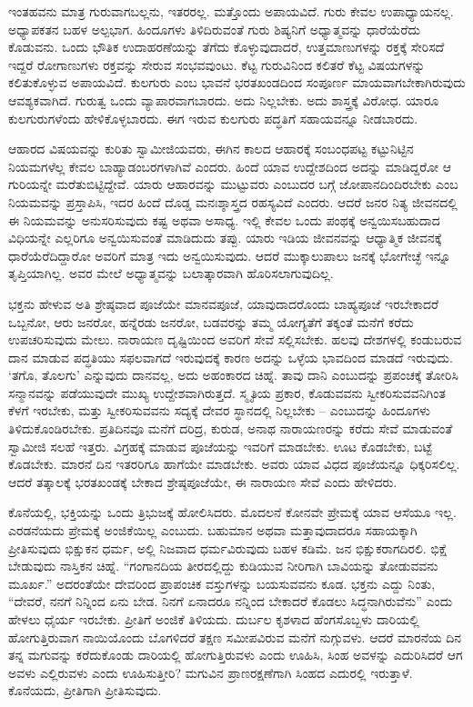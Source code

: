 ಇಂತಹವನು ಮಾತ್ರ ಗುರುವಾಗಬಲ್ಲನು, ಇತರರಲ್ಲ. ಮತ್ತೊಂದು ಅಪಾಯವಿದೆ. ಗುರು ಕೇವಲ ಉಪಾಧ್ಯಾಯನಲ್ಲ. ಅಧ್ಯಾಪಕತನ ಬಹಳ ಅಲ್ಪಭಾಗ. ಹಿಂದೂಗಳು ತಿಳಿದಿರುವಂತೆ ಗುರು ಶಿಷ್ಯನಿಗೆ ಅಧ್ಯಾತ್ಮವನ್ನು ಧಾರೆಯೆರೆದು ಕೊಡುವನು. ಒಂದು ಭೌತಿಕ ಉದಾಹರಣೆಯನ್ನು ತೆಗೆದು ಕೊಳ್ಳುವುದಾದರೆ, ಉತ್ತಮಾಣುಗಳನ್ನು ರಕ್ತಕ್ಕೆ ಸೇರಿಸದೆ ಇದ್ದರೆ ರೋಗಾಣುಗಳು ರಕ್ತವನ್ನು ಸೇರುವ ಸಂಭವವುಂಟು. ಕೆಟ್ಟ ಗುರುವಿನಿಂದ ಕಲಿತರೆ ಕೆಟ್ಟ ವಿಷಯಗಳನ್ನು ಕಲಿತುಕೊಳ್ಳುವ ಅಪಾಯವಿದೆ. ಕುಲಗುರು ಎಂಬ ಭಾವನೆ ಭರತಖಂಡದಿಂದ ಸಂಪೂರ್ಣ ಮಾಯವಾಗಬೇಕಾಗಿರುವುದು ಆವಶ್ಯಕವಾಗಿದೆ. ಗುರುತ್ವ ಒಂದು ವ್ಯಾಪಾರವಾಗಬಾರದು. ಅದು ನಿಲ್ಲಬೇಕು. ಅದು ಶಾಸ್ತ್ರಕ್ಕೆ ವಿರೋಧ. ಯಾರೂ ಕುಲಗುರುಗಳೆಂದು ಹೇಳಿಕೊಳ್ಳಬಾರದು. ಈಗ ಇರುವ ಕುಲಗುರು ಪದ್ಧತಿಗೆ ಸಹಾಯವನ್ನೂ ನೀಡಬಾರದು.

ಆಹಾರದ ವಿಷಯವನ್ನು ಕುರಿತು ಸ್ವಾಮೀಜಿಯವರು, ಈಗಿನ ಕಾಲದ ಆಹಾರಕ್ಕೆ ಸಂಬಂಧಪಟ್ಟ ಕಟ್ಟುನಿಟ್ಟಿನ ನಿಯಮಗಳೆಲ್ಲ ಕೇವಲ ಬಾಹ್ಯಾಡಂಬರಗಳಾಗಿವೆ ಎಂದರು. ಹಿಂದೆ ಯಾವ ಉದ್ದೇಶದಿಂದ ಅದನ್ನು ಮಾಡಿದ್ದರೋ ಆ ಗುರಿಯನ್ನೇ ಮರೆತುಬಿಟ್ಟಿದ್ದೇವೆ. ಯಾರು ಆಹಾರವನ್ನು ಮುಟ್ಟುವರು ಎಂಬುದರ ಬಗ್ಗೆ ಜೋಪಾನದಿಂದಿರಬೇಕು ಎಂಬ ನಿಯಮವನ್ನು ಪ್ರಸ್ತಾಪಿಸಿ, ಇದರ ಹಿಂದೆ ದೊಡ್ಡ ಮನಃಶ್ಶಾಸ್ತ್ರದ ರಹಸ್ಯವಿದೆ ಎಂದರು. ಆದರೆ ಜನರ ನಿತ್ಯ ಜೀವನದಲ್ಲಿ ಈ ನಿಯಮವನ್ನು ಅನುಸರಿಸುವುದು ಕಷ್ಟ ಅಥವಾ ಅಸಾಧ್ಯ. ಇಲ್ಲಿ ಕೇವಲ ಒಂದು ಪಂಥಕ್ಕೆ ಅನ್ವಯಿಸಬಹುದಾದ ವಿಧಿಯನ್ನೇ ಎಲ್ಲರಿಗೂ ಅನ್ವಯಿಸುವಂತೆ ಮಾಡಿದುದು ತಪ್ಪು. ಯಾರು ಇಡಿಯ ಜೀವನವನ್ನು ಆಧ್ಯಾತ್ಮಿಕ ಜೀವನಕ್ಕೆ ಧಾರೆಯೆರೆದಿದ್ದಾರೋ ಅವರಿಗೆ ಮಾತ್ರ ಇದು ಅನ್ವಯಿಸುವುದು. ಆದರೆ ಮುಕ್ಕಾಲುಪಾಲು ಜನಕ್ಕೆ ಭೋಗೇಚ್ಛೆ ಇನ್ನೂ ತೃಪ್ತಿಯಾಗಿಲ್ಲ. ಅವರ ಮೇಲೆ ಅಧ್ಯಾತ್ಮವನ್ನು ಬಲಾತ್ಕಾರವಾಗಿ ಹೊರಿಸಲಾಗುವುದಿಲ್ಲ.

ಭಕ್ತನು ಹೇಳುವ ಅತಿ ಶ್ರೇಷ್ಠವಾದ ಪೂಜೆಯೇ ಮಾನವಪೂಜೆ, ಯಾವುದಾದರೊಂದು ಬಾಹ್ಯಪೂಜೆ ಇರಬೇಕಾದರೆ ಒಬ್ಬನೋ, ಆರು ಜನರೋ, ಹನ್ನೆರಡು ಜನರೋ, ಬಡವರನ್ನು ತಮ್ಮ ಯೋಗ್ಯತೆಗೆ ತಕ್ಕಂತೆ ಮನೆಗೆ ಕರೆದು ಉಪಚರಿಸುವುದು ಮೇಲು. ನಾರಾಯಣ ದೃಷ್ಟಿಯಿಂದ ಅವರಿಗೆ ಸೇವೆ ಸಲ್ಲಿಸಬೇಕು. ಹಲವು ದೇಶಗಳಲ್ಲಿ ಕಂಡುಬರುವ ದಾನ ಮಾಡುವ ಪದ್ಧತಿಯು ಸಫಲವಾಗದೆ ಇರುವುದಕ್ಕೆ ಕಾರಣ ಅದನ್ನು ಒಳ್ಳೆಯ ಭಾವದಿಂದ ಮಾಡದೆ ಇರುವುದು. ‘ತಗೊ, ತೊಲಗು’ ಎನ್ನುವುದು ದಾನವಲ್ಲ, ಅದು ಅಹಂಕಾರದ ಚಿಹ್ನೆ. ತಾವು ದಾನಿ ಎಂಬುದನ್ನು ಪ್ರಪಂಚಕ್ಕೆ ತೋರಿಸಿ ಸನ್ಮಾನವನ್ನು ಪಡೆಯುವುದೇ ಮುಖ್ಯ ಉದ್ದೇಶವಾಗಿರುತ್ತದೆ. ಸ್ಮೃತಿಯ ಪ್ರಕಾರ, ಕೊಡುವವನು ಸ್ವೀಕರಿಸುವವನಿಗಿಂತ ಕೆಳಗೆ ಇರಬೇಕು, ಮತ್ತು ಸ್ವೀಕರಿಸುವವನು ಸದ್ಯಕ್ಕೆ ದೇವರ ಸ್ಥಾನದಲ್ಲಿ ನಿಲ್ಲಬೇಕು – ಎಂಬುದನ್ನು ಹಿಂದೂಗಳು ತಿಳಿದುಕೊಂಡಿರಬೇಕು. ಪ್ರತಿದಿನವೂ ಮನೆಗೆ ದರಿದ್ರ, ಕುರುಡ, ಅನಾಥ ನಾರಾಯಣರನ್ನು ಕರೆದು ಸೇವೆ ಮಾಡುವಂತೆ ಸ್ವಾಮೀಜಿ ಸಲಹೆ ಇತ್ತರು. ವಿಗ್ರಹಕ್ಕೆ ಮಾಡುವ ಪೂಜೆಯನ್ನು ಇವರಿಗೆ ಮಾಡಬೇಕು. ಊಟ ಕೊಡಬೇಕು, ಬಟ್ಟೆ ಕೊಡಬೇಕು. ಮಾರನೆ ದಿನ ಇತರರಿಗೂ ಹಾಗೆಯೇ ಮಾಡಬೇಕು. ಅವರು ಯಾವ ವಿಧದ ಪೂಜೆಯನ್ನೂ ಧಿಕ್ಕರಿಸಲಿಲ್ಲ. ಆದರೆ ತತ್ಕಾಲಕ್ಕೆ ಭರತಖಂಡಕ್ಕೆ ಬೇಕಾದ ಶ್ರೇಷ್ಠಪೂಜೆಯೇ, ಈ ನಾರಾಯಣ ಸೇವೆ ಎಂದು ಹೇಳಿದರು.

ಕೊನೆಯಲ್ಲಿ, ಭಕ್ತಿಯನ್ನು ಒಂದು ತ್ರಿಭುಜಕ್ಕೆ ಹೋಲಿಸಿದರು. ಮೊದಲನೆ ಕೋನವೇ ಪ್ರೇಮಕ್ಕೆ ಯಾವ ಆಸೆಯೂ ಇಲ್ಲ. ಎರಡನೆಯದು ಪ್ರೇಮಕ್ಕೆ ಅಂಜಿಕೆಯಿಲ್ಲ ಎಂಬುದು. ಬಹುಮಾನ ಅಥವಾ ಮತ್ತಾವುದಾದರೂ ಸಹಾಯಕ್ಕಾಗಿ ಪ್ರೀತಿಸುವುದು ಭಿಕ್ಷುಕನ ಧರ್ಮ, ಅಲ್ಲಿ ನಿಜವಾದ ಧರ್ಮವಿರುವುದು ಬಹಳ ಕಡಿಮೆ. ಜನ ಭಿಕ್ಷುಕರಾಗದಿರಲಿ. ಭಿಕ್ಷೆ ಬೇಡುವುದು ನಾಸ್ತಿಕನ ಚಿಹ್ನೆ. “ಗಂಗಾನದಿಯ ತೀರದಲ್ಲಿದ್ದು ಕುಡಿಯುವ ನೀರಿಗಾಗಿ ಬಾವಿಯನ್ನು ತೋಡುವವನು ಮೂರ್ಖ.” ಅದರಂತೆಯೇ ದೇವರಿಂದ ಪ್ರಾಪಂಚಿಕ ವಸ್ತುಗಳನ್ನು ಬಯಸುವವನು ಕೂಡ. ಭಕ್ತನು ಎದ್ದು ನಿಂತು, “ದೇವರೆ, ನನಗೆ ನಿನ್ನಿಂದ ಏನು ಬೇಡ. ನಿನಗೆ ಏನಾದರೂ ನನ್ನಿಂದ ಬೇಕಾದರೆ ಕೊಡಲು ಸಿದ್ಧನಾಗಿರುವೆನು” ಎಂದು ಹೇಳಲು ಧೈರ್ಯ ಇರಬೇಕು. ಪ್ರೀತಿಗೆ ಅಂಜಿಕೆ ತಿಳಿಯದು. ದುರ್ಬಲ ಕೃಶಳಾದ ಹೆಂಗಸೊಬ್ಬಳು ದಾರಿಯಲ್ಲಿ ಹೋಗುತ್ತಿರುವಾಗ ನಾಯಿಯೊಂದು ಬೊಗಳಿದರೆ ತಕ್ಷಣ ಸಮೀಪವಿರುವ ಮನೆಗೆ ನುಗ್ಗುವಳು. ಆದರೆ ಮಾರನೆಯ ದಿನ ತನ್ನ ಮಗುವನ್ನು ಕರೆದುಕೊಂಡು ದಾರಿಯಲ್ಲಿ ಹೋಗುತ್ತಿರುವಳು ಎಂದು ಊಹಿಸಿ, ಸಿಂಹ ಅವಳನ್ನು ಎದುರಿಸಿದರೆ ಆಗ ಅವಳು ಎಲ್ಲಿರುವಳು ಎಂದು ಊಹಿಸುತ್ತೀರಿ? ಮಗುವಿನ ಪ್ರಾಣರಕ್ಷಣೆಗಾಗಿ ಸಿಂಹದ ಎದುರಲ್ಲಿ ಇರುತ್ತಾಳೆ. ಕೊನೆಯದು, ಪ್ರೀತಿಗಾಗಿ ಪ್ರೀತಿಸುವುದು.

